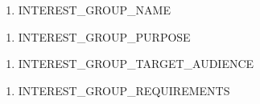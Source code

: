 

\begin{enumerate}
	\item INTEREST_GROUP_NAME
\end{enumerate}


\begin{enumerate}
	\item INTEREST_GROUP_PURPOSE
\end{enumerate}


\begin{enumerate}
	\item INTEREST_GROUP_TARGET_AUDIENCE
\end{enumerate}



\begin{enumerate}
	\item INTEREST_GROUP_REQUIREMENTS
\end{enumerate}